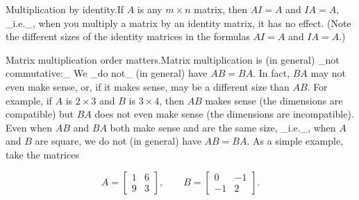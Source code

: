 Multiplication by identity.If \(A\) is any \(m\times n\) matrix, then \(AI=A\) and \(IA=A\), _i.e._, when you multiply a matrix by an identity matrix, it has no effect. (Note the different sizes of the identity matrices in the formulas \(AI=A\) and \(IA=A\).)

Matrix multiplication order matters.Matrix multiplication is (in general) _not commutative:_ We _do not_ (in general) have \(AB=BA\). In fact, \(BA\) may not even make sense, or, if it makes sense, may be a different size than \(AB\). For example, if \(A\) is \(2\times 3\) and \(B\) is \(3\times 4\), then \(AB\) makes sense (the dimensions are compatible) but \(BA\) does not even make sense (the dimensions are incompatible). Even when \(AB\) and \(BA\) both make sense and are the same size, _i.e._, when \(A\) and \(B\) are square, we do not (in general) have \(AB=BA\). As a simple example, take the matrices

\[A=\left[\begin{array}{cc}1&6\\ 9&3\end{array}\right],\qquad B=\left[\begin{array}{cc}0&-1\\ -1&2\end{array}\right].\] 